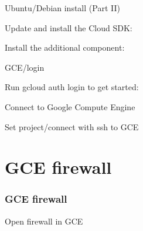 \documentclass{beamer}
\begin{document}
\begin{frame} 

Ubuntu/Debian install  (Part II)

\begin{block}{Update and install the Cloud SDK:}
\lstD
\end{block}


\begin{block}{Install the additional component:}
\lstE
\end{block}



	
\end{frame}




\begin{frame} 

GCE/login

\begin{block}{Run gcloud auth login to get started:}
\lstauthlogin
\end{block}
	
\end{frame}



\begin{frame} 

Connect to Google Compute Engine

\begin{block}{Set project/connect with ssh to GCE}
\lstconnect
\end{block}

	
\end{frame}



\section{GCE firewall} 
\begin{frame}\frametitle{GCE firewall} 

\begin{block}{Open firewall in GCE}
\lstfirewall
\end{block}


\end{frame}
\end{document}
